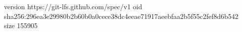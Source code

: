 version https://git-lfs.github.com/spec/v1
oid sha256:296ea3e29980b2b60b0a0cece38dc4eeae71917aeebfaa2b5f55c2fef8d6b542
size 155905

